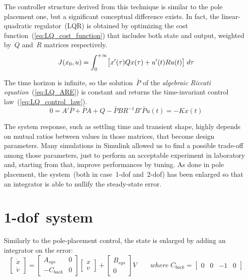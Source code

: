 
The controller structure derived from this technique is similar to the pole placement one, but a significant conceptual difference exists. In fact, the linear-quadratic regulator~(LQR) is obtained by optimizing the cost function~(\cref{eq:LQ_cost_function}) that includes both state and output, weighted by~$Q$ and~$R$ matrices respectively.
\[
	J(x_0, u) = \int_{0}^{+\infty} \bigl{[} x'(\tau)Qx(\tau) + u'(t)Ru(t) \bigr{]} \; d\tau
	\label{eq:LQ_cost_function}
\]

The time horizon is infinite, so the solution~$\bar{P}$ of the \textit{algebraic Riccati equation}~(\cref{eq:LQ_ARE}) is constant and returns the time-invariant control law~(\ref{eq:LQ_control_law}).
\begin{subequations}
	\begin{equation}
		0 = A' \bar{P} + \bar{P} A + Q - \bar{P} B R^{-1} B' \bar{P}
		\label{eq:LQ_ARE}
	\end{equation}
	\begin{equation}
		u(t) = -K x(t)
		\label{eq:LQ_control_law}
	\end{equation}
\end{subequations}

The system response, such as settling time and transient shape, highly depends on mutual ratios between values in those matrices, that become design parameters. Many simulations in Simulink allowed us to find a possible trade-off among those parameters, just to perform an acceptable experiment in laboratory and, starting from that, improve performances by tuning.
As done in pole placement, the system~(both in case~\acrshort{1-dof} and~\acrshort{2-dof}) has been enlarged so that an integrator is able to nullify the steady-state error.

\section{\acrshort{1-dof}\ system}

Similarly to the pole-placement control, the state is enlarged by adding an integrator on the error:
\begin{equation}
	\begin{bmatrix}
		\dot{x} \\
		\dot{v}
	\end{bmatrix}
	=
	\begin{bmatrix}
		A_{sys} & 0 \\
		-C_{back} & 0
	\end{bmatrix}
	\begin{bmatrix}
		x \\
		v
	\end{bmatrix}
	+
	\begin{bmatrix}
		B_{sys} \\
		0
	\end{bmatrix}
	V
	\qquad
	where \; C_{back} =
	\begin{bmatrix}
		0 & 0 & -1 & 0
	\end{bmatrix}
\end{equation}

